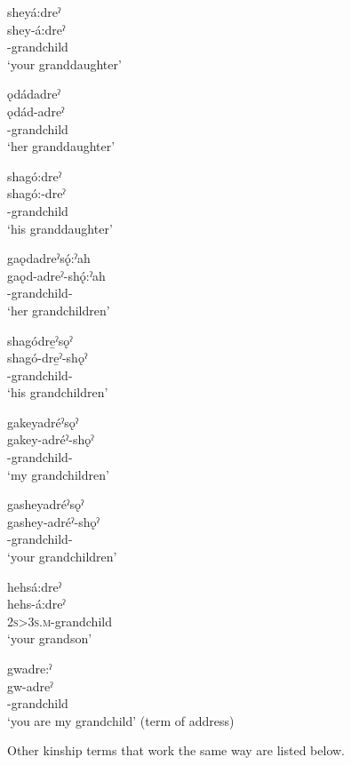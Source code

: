\ex sheyá:dreˀ\\\label{ex:interkintermppex3e}
\gll shey-á:dreˀ\\
 -grandchild\\
\glt `your granddaughter'

\ex ǫdádadreˀ\\\label{ex:interkintermppex3f}
\gll ǫdád-adreˀ\\
 -grandchild\\
\glt `her granddaughter'

\ex shagó:dreˀ\\\label{ex:interkintermppex3g}
\gll shagó:-dreˀ\\
 -grandchild \\
\glt `his granddaughter'

\ex gaǫdadreˀsǫ́:ˀah\\\label{ex:interkintermppex3h}
\gll gaǫd-adreˀ-shǫ́:ˀah\\
 -grandchild-{\pluralizer}\\
\glt `her grandchildren'

\newpage
\ex shagódre̱ˀsǫˀ\\\label{ex:interkintermppex3i}
\gll shagó-dre̱ˀ-shǫˀ\\
 -grandchild-{\pluralizer}\\
\glt `his grandchildren'

\ex gakeyadréˀsǫˀ\\
\gll gakey-adréˀ-shǫˀ\\
 -grandchild-{\pluralizer}\\
\glt `my grandchildren'

\ex gasheyadréˀsǫˀ\\
\gll gashey-adréˀ-shǫˀ\\
-grandchild-{\pluralizer}\\
\glt `your grandchildren'

\ex hehsá:dreˀ\\
\gll hehs-á:dreˀ\\
 \textsc{2s>3s.m}-grandchild \\
\glt `your grandson'

\ex gwadre:ˀ\\
\gll gw-adreˀ\\
 -grandchild \\
\glt `you are my grandchild' (term of address)
\z
\z

Other kinship terms that work the same way are listed below. 

